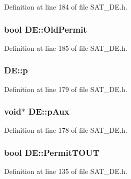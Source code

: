 Definition at line 184 of file S\-A\-T\-\_\-\-D\-E.\-h.

\hypertarget{classDE_a210930a504af06e95856cb71411b2a6b}{
\subsubsection[{Old\-Permit}]{\setlength{\rightskip}{0pt plus 5cm}bool D\-E\-::\-Old\-Permit\hspace{0.3cm}{\ttfamily [private]}}}\label{classDE_a210930a504af06e95856cb71411b2a6b}


Definition at line 185 of file S\-A\-T\-\_\-\-D\-E.\-h.

\hypertarget{classDE_af16ce45fb590ddb2ae5225b5cfc95f87}{
\subsubsection[{p}]{ D\-E\-::p\hspace{0.3cm}{\ttfamily [private]}}}\label{classDE_af16ce45fb590ddb2ae5225b5cfc95f87}


Definition at line 179 of file S\-A\-T\-\_\-\-D\-E.\-h.

\hypertarget{classDE_ab8fad10a55cec3f9755444ae5ee38903}{
\subsubsection[{p\-Aux}]{\setlength{\rightskip}{0pt plus 5cm}void$\ast$ D\-E\-::p\-Aux\hspace{0.3cm}{\ttfamily [private]}}}\label{classDE_ab8fad10a55cec3f9755444ae5ee38903}


Definition at line 178 of file S\-A\-T\-\_\-\-D\-E.\-h.

\hypertarget{classDE_ab4adac8a112f4c5b5600986b418e5129}{
\subsubsection[{Permit\-T\-O\-U\-T}]{\setlength{\rightskip}{0pt plus 5cm}bool D\-E\-::\-Permit\-T\-O\-U\-T}}\label{classDE_ab4adac8a112f4c5b5600986b418e5129}


Definition at line 135 of file S\-A\-T\-\_\-\-D\-E.\-h.

